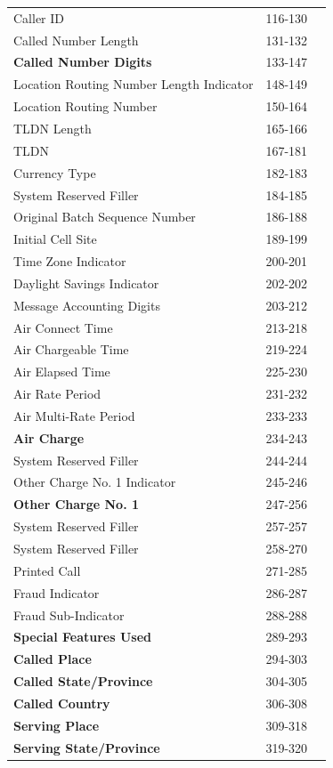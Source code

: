 \documentclass[12pt,twoside]{article}
\begin{document}
\begin{longtable}{l|l|l}
Caller ID & 116-130 & \\
Called Number Length & 131-132 & \\
\textbf{Called Number Digits} & 133-147 & \\
Location Routing Number Length Indicator & 148-149 & \\
Location Routing Number & 150-164 & \\
TLDN Length & 165-166 & \\
TLDN & 167-181 & \\
Currency Type & 182-183 & \\
System Reserved Filler & 184-185 & \\
Original Batch Sequence Number & 186-188 & \\
Initial Cell Site & 189-199 & \\
Time Zone Indicator & 200-201 & \\
Daylight Savings Indicator & 202-202 & \\
Message Accounting Digits & 203-212 & \\
Air Connect Time & 213-218 & \\
Air Chargeable Time & 219-224 & \\
Air Elapsed Time & 225-230 & \\
Air Rate Period & 231-232 & \\
Air Multi-Rate Period & 233-233 & \\
\textbf{Air Charge} & 234-243 & \\
System Reserved Filler & 244-244 & \\
Other Charge No. 1 Indicator & 245-246 & \\
\textbf{Other Charge No. 1} & 247-256 & \\
System Reserved Filler & 257-257 & \\
System Reserved Filler & 258-270 & \\
Printed Call & 271-285 & \\
Fraud Indicator & 286-287 & \\
Fraud Sub-Indicator & 288-288 & \\
\textbf{Special Features Used} & 289-293 & \\
\textbf{Called Place} & 294-303 & \\
\textbf{Called State/Province} & 304-305 & \\
\textbf{Called Country} & 306-308 & \\
\textbf{Serving Place} & 309-318 & \\
\textbf{Serving State/Province} & 319-320 & \\

\end{longtable}
\end{document}
